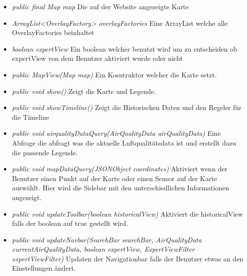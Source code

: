 \begin{itemize} [noitemsep]
    \item \emph{public final Map map} Die auf der Website angezeigte Karte
    \item \emph{ArrayList<OverlayFactory> overlayFactories} Eine ArrayList welche alle OverlayFactories beinhaltet
    \item \emph{boolean expertView} Ein boolean welcher benutzt wird um zu entscheiden ob expertView von dem Benutzer aktiviert wurde oder nicht
    \item \emph{public MapView(Map map)} Ein Kosntruktor welcher die Karte setzt.
    \item \emph{public void show()} Zeigt die Karte und Legende.
    \item \emph{public void showTimeline()} Zeigt die Historischen Daten und den Regeler für die Timeline
    \item \emph{public void airqualityDataQuery(AirQualityData airQualityData)} Eine Abfrage die abfragt was die aktuelle Luftqualitätsdata ist und erstellt dazu die passende Legende. 
    \item \emph{public void mapDataQuery(JSONObject coordinates)} Aktiviert wenn der Benutzer einen Punkt auf der Karte oder einen Sensor auf der Karte auswählt. Hier wird die Sidebar mit den unterschiedlichen Informationen angezeigt.
    \item \emph{public void updateToolbar(boolean historicalView)} Aktiviert die historicalView falls der boolean auf true gestellt wird.
    \item \emph{public void updateNavbar(SearchBar searchBar, AirQualityData currentAirQualityData,
    boolean expertView, ExpertViewFilter expertViewFilter)} Updaten der Navigationbar falls der Benutzer etwas an den Einstellungen ändert.
\end{itemize} 

